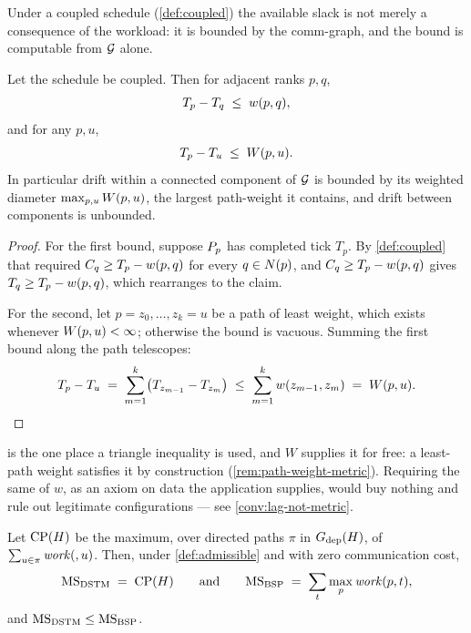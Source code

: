 Under a coupled schedule (\cref{def:coupled}) the available slack is not
merely a consequence of the workload: it is bounded by the
\gls{comm-graph}, and the bound is computable from $\mathcal{G}$ alone.

\begin{proposition}\label{prop:drift-bound}
Let the schedule be coupled. Then for adjacent ranks $p, q$,
\[
  T_p - T_q \;\le\; w(p,q),
\]
and for any $p, u$,
\[
  T_p - T_u \;\le\; W(p,u) .
\]
In particular drift within a connected component of $\mathcal{G}$ is bounded by
its weighted diameter $\max_{p,u} W(p,u)$, the largest \gls{path-weight}
it contains, and drift between components is
unbounded.
\end{proposition}

\begin{proof}
For the first bound, suppose $P_{p}$ has completed tick $T_p$. By
\cref{def:coupled} that required $C_{q} \ge T_p - w(p,q)$ for every
$q \in N(p)$, and $C_{q} \ge T_p - w(p,q)$ gives
$T_q \ge T_p - w(p,q)$, which rearranges to the claim.

For the second, let $p = z_0, \dots, z_k = u$ be a path of least weight,
which exists whenever $W(p,u) < \infty$; otherwise the bound is vacuous.
Summing the first bound along the path telescopes:
\[
  T_p - T_u \;=\; \sum_{m=1}^{k} \bigl(T_{z_{m-1}} - T_{z_m}\bigr)
  \;\le\; \sum_{m=1}^{k} w(z_{m-1},z_m) \;=\; W(p,u). \qedhere
\]
\end{proof}

\begin{remark}
 is the one place a triangle inequality is used, and
$W$ supplies it for free: a least-path weight satisfies it by construction
(\cref{rem:path-weight-metric}). Requiring the same of $w$, as an axiom on
data the application supplies, would buy nothing and rule out legitimate
configurations --- see \cref{conv:lag-not-metric}.
\end{remark}

\begin{theorem}[Makespan]\label{thm:makespan}
Let $\mathrm{CP}(H)$ be the maximum, over directed paths $\pi$ in
$G_{\mathrm{dep}}(H)$, of $\sum_{u \in \pi} \mathit{work}(,u)$. Then, under
\cref{def:admissible} and with zero communication cost,
\[
  \mathrm{MS}_{\mathrm{DSTM}} \;=\; \mathrm{CP}(H)
  \qquad\text{and}\qquad
  \mathrm{MS}_{\mathrm{BSP}} \;=\; \sum_{t} \max_{p} \mathit{work}(p,t),
\]
and $\mathrm{MS}_{\mathrm{DSTM}} \le \mathrm{MS}_{\mathrm{BSP}}$.
\end{theorem}

